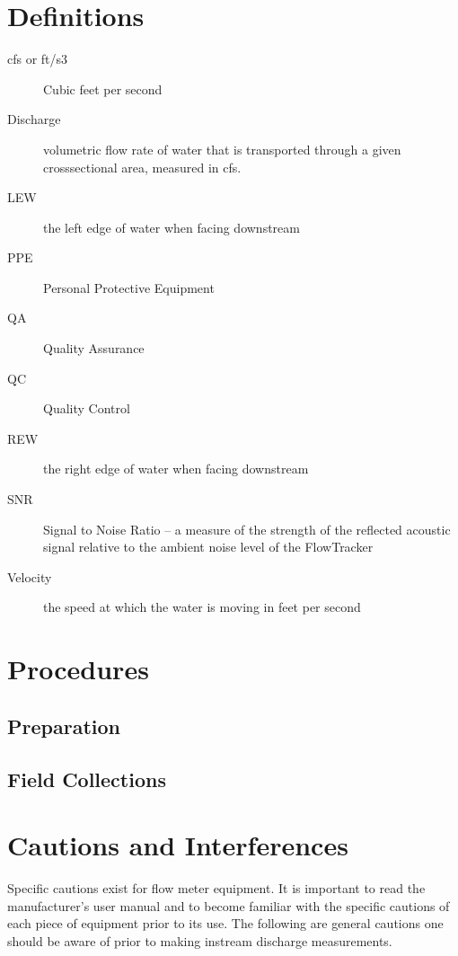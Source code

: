 \documentclass[12pt]{../SOP3_beta}\usepackage[]{graphicx}\usepackage[]{xcolor}
\begin{document}
\section{Definitions}

\begin{description}
\item[cfs or ft/s3] Cubic feet per second
\item[Discharge] volumetric flow rate of water that is transported through a given crosssectional area, measured in cfs.

\item[LEW] the left edge of water when facing downstream
\item[PPE] Personal Protective Equipment
\item[QA] Quality Assurance
\item[QC] Quality Control
\item[REW] the right edge of water when facing downstream
\item[SNR] Signal to Noise Ratio – a measure of the strength of the reflected acoustic signal relative to the ambient noise level of the FlowTracker
\item[Velocity] the speed at which the water is moving in feet per second

\end{description}

\section{Procedures}

\subsection{Preparation}

\subsection{Field Collections}

\NP 

\section{Cautions and Interferences}

Specific cautions exist for flow meter equipment. It is important to read the
manufacturer’s user manual and to become familiar with the specific cautions of each
piece of equipment prior to its use. The following are general cautions one should be
aware of prior to making instream discharge measurements.
\end{document}
